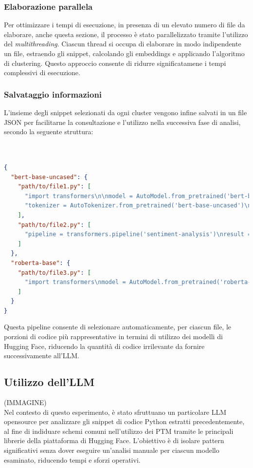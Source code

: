 \documentclass{article}
\newcommand{\JDR}[1]{\textbf{\textcolor{red}{JDR: {#1}}}}
\begin{document}
\subsubsection{Elaborazione parallela}
Per ottimizzare i tempi di esecuzione, in presenza di un elevato numero di file da elaborare, anche questa sezione, il processo è stato parallelizzato tramite l’utilizzo del \textit{multithreading}. Ciascun thread si occupa di elaborare in modo indipendente un file, estraendo gli snippet, calcolando gli embeddings e applicando l’algoritmo di clustering. Questo approccio consente di ridurre significatamene i tempi complessivi di esecuzione.

\subsubsection{Salvataggio informazioni}
L'insieme degli snippet selezionati da ogni cluster vengono infine salvati in un file JSON per facilitarne la consultazione e l’utilizzo nella successiva fase di analisi, secondo la seguente struttura:\\\\\\
\begin{lstlisting}[language=json, caption={\JDR{VERO SEMPRE: se hai messo un listing, table o figura va sempre referenziata nel testo}Esempio di struttura JSON dei migliori snippet selezionati}, label={lst:json-snippet}]
{
  "bert-base-uncased": {
    "path/to/file1.py": [
      "import transformers\n\nmodel = AutoModel.from_pretrained('bert-base-uncased')",
      "tokenizer = AutoTokenizer.from_pretrained('bert-base-uncased')\ninputs = tokenizer('Hello world', return_tensors='pt')"
    ],
    "path/to/file2.py": [
      "pipeline = transformers.pipeline('sentiment-analysis')\nresult = pipeline('I love coding!')"
    ]
  },
  "roberta-base": {
    "path/to/file3.py": [
      "import transformers\nmodel = AutoModel.from_pretrained('roberta-base')"
    ]
  }
}
\end{lstlisting}
Questa pipeline consente di selezionare automaticamente, per ciascun file, le porzioni di codice più rappresentative in termini di utilizzo dei modelli di Hugging Face, riducendo la quantità di codice irrilevante da fornire successivamente all'LLM.


\subsection{Utilizzo dell'LLM}
(IMMAGINE)\\
Nel contesto di questo esperimento, è stato sfruttuano un particolare LLM opensource per analizzare gli snippet di codice Python estratti precedentemente, al fine di indiduare schemi comuni nell'utilizzo dei PTM tramite le principali librerie della piattaforma di Hugging Face.
L'obiettivo è di isolare pattern significativi senza dover eseguire un'analisi manuale per ciascun modello esaminato, riducendo tempi e sforzi operativi.
\end{document}
